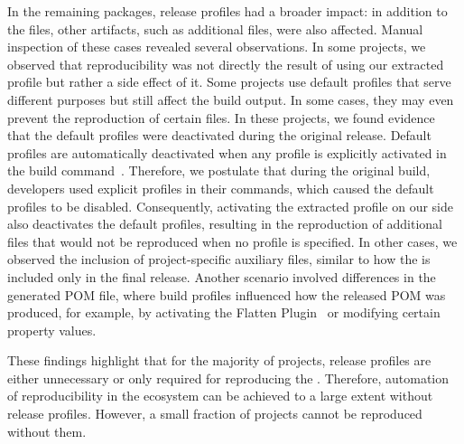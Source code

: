 \documentclass[smallextended]{svjour3}
\newcommand{\maven}[1]{\tool{Maven{#1}}}
\begin{document}
{In the remaining  packages, release profiles had a broader impact: in addition to the  files, other artifacts, such as additional  files, were also affected. Manual inspection of these cases revealed several observations. In some projects, we observed that reproducibility was not directly the result of using our extracted profile but rather a side effect of it. Some projects use default profiles that serve different purposes but still affect the build output. In some cases, they may even prevent the reproduction of certain files. In these projects, we found evidence that the default profiles were deactivated during the original release. Default profiles are automatically deactivated when any profile is explicitly activated in the build command~\cite{ActivebyDefaultProfiles}. Therefore, we postulate that during the original build, developers used explicit profiles in their commands, which caused the default profiles to be disabled. Consequently, activating the extracted profile on our side also deactivates the default profiles, resulting in the reproduction of additional files that would not be reproduced when no profile is specified. In other cases, we observed the inclusion of project-specific auxiliary files, similar to how the  is included only in the final release. Another scenario involved differences in the generated POM file, where build profiles influenced how the released POM was produced, for example, by activating the Flatten \maven{} Plugin~\cite{MavenFlattenPlugin} or modifying certain property values.


These findings highlight that for the majority of projects, release profiles are either unnecessary or only required for reproducing the . Therefore, automation of reproducibility in the \maven{} ecosystem can be achieved to a large extent without release profiles. However, a small fraction of projects cannot be reproduced without them.


}
\end{document}
